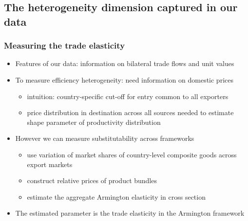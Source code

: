 \documentclass{beamer}
\newcommand{\noteLA}[1]{\textcolor{blue}{\footnotesize\textit{{noteLA: #1}}}} %
\def\noteLA #1{} %
\begin{document}
\subsection{The heterogeneity dimension captured in our data}
\begin{frame}\frametitle{Measuring the trade elasticity}
\vspace{0.3cm}
\begin{itemize}
\item Features of our data: information on bilateral trade flows and unit values
\item To measure efficiency heterogeneity: need information on domestic prices 
\begin{itemize}
\item intuition: country-specific cut-off for entry common to all exporters 
\item price distribution in destination across all sources needed to estimate shape parameter of productivity distribution
\end{itemize}
\vspace{0.3cm}
\item However we can measure substitutability across frameworks
\begin{itemize}
\item use variation of market shares of country-level composite goods across export markets 
\item construct relative prices of product bundles
\item estimate the aggregate Armington elasticity in cross section
\end{itemize}
\item The estimated parameter is the trade elasticity in the Armington framework
\end{itemize}
\end{frame}
\noteLA{Say: for this parameter to be valid across frameworks means making a strong assumption on fixed costs of trade: so small that all export}
\noteLA{Say: in Armington model, producer heterogeneity not modelled: source-specific cost component gives directly the price of the exported good: trade elasticity can be estimated using source-specific price distributions}
\end{document}
